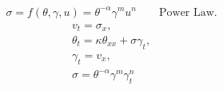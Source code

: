 \documentclass[a4paper,11pt]{article}
\theoremstyle{remark}
\begin{document}
%
\begin{align}
&  \sigma =  f(\theta, \gamma, u) = \theta^{-\alpha} \gamma^{m} u^{n} \quad \quad \text{Power Law}. \label{PL0}
\end{align}
%
%
\begin{equation}
  \label{PLS}
  \begin{aligned}
    & v_{t} = \sigma_{x},\\
    & \theta_{t} = \kappa \theta_{ x x}  +  \sigma \gamma_{t}, \\
    & \gamma_{t} = v_{x},  \\
    & \sigma  = \theta^{-\alpha}\gamma^{m}\gamma_{t}^n \,
  \end{aligned}
\end{equation}
\end{document}
